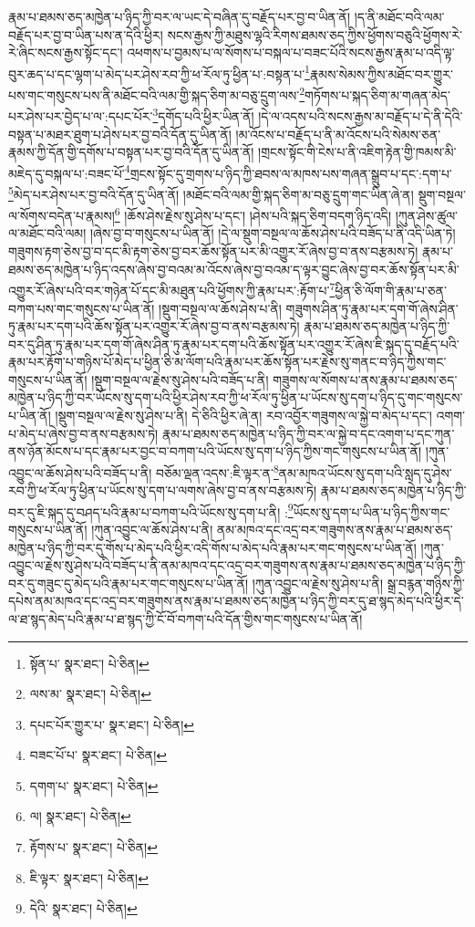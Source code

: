 རྣམ་པ་ཐམས་ཅད་མཁྱེན་པ་ཉིད་ཀྱི་བར་ལ་ཡང་དེ་བཞིན་དུ་བརྗོད་པར་བྱ་བ་ཡིན་ནོ། །ད་ནི་མཐོང་བའི་ལམ་བརྗོད་པར་བྱ་བ་ཡིན་པས་ན་དེའི་ཕྱིར། སངས་རྒྱས་ཀྱི་མཐུས་ལྷའི་རིགས་ཐམས་ཅད་ཀྱིས་ཕྱོགས་བཅུའི་ཕྱོགས་རེ་རེ་ཞིང་སངས་རྒྱས་སྟོང་དང་། འཕགས་པ་བྱམས་པ་ལ་སོགས་པ་བསྐལ་པ་བཟང་པོའི་སངས་རྒྱས་རྣམ་པ་འདི་ལྟ་བུར་ཆད་པ་དང་ལྷག་པ་མེད་པར་ཤེས་རབ་ཀྱི་ཕ་རོལ་ཏུ་ཕྱིན་པ་:བསྟན་པ་\footnote{སྟོན་པ་  སྣར་ཐང་།  པེ་ཅིན། }རྣམས་སེམས་ཀྱིས་མཐོང་བར་གྱུར་པས་གང་གསུངས་པས་ནི་མཐོང་བའི་ལམ་གྱི་སྐད་ཅིག་མ་བཅུ་དྲུག་ལས་\footnote{ལས་མ་  སྣར་ཐང་།  པེ་ཅིན། }གཏོགས་པ་སྐད་ཅིག་མ་གཞན་མེད་པར་ཤེས་པར་བྱེད་པ་ལ་:དཔང་པོར་\footnote{དཔང་པོར་གྱུར་པ་  སྣར་ཐང་།  པེ་ཅིན། }དགོད་པའི་ཕྱིར་ཡིན་ནོ། །དེ་ལ་འདས་པའི་སངས་རྒྱས་མ་བརྗོད་པ་དེ་ནི་དེའི་བསྟན་པ་མཐར་ཐུག་པ་ཤེས་པར་བྱ་བའི་དོན་དུ་ཡིན་ནོ། །མ་འོངས་པ་བརྗོད་པ་ནི་མ་འོངས་པའི་སེམས་ཅན་རྣམས་ཀྱི་དོན་གྱི་དགོས་པ་བསྟན་པར་བྱ་བའི་དོན་དུ་ཡིན་ནོ། །གྲངས་སྟོང་གི་ངེས་པ་ནི་འཇིག་རྟེན་གྱི་ཁམས་མི་མཇེད་དུ་བསྐལ་པ་:བཟང་པོ་\footnote{བཟང་པོ་པ་  སྣར་ཐང་།  པེ་ཅིན། }གྲངས་སྟོང་དུ་གྲགས་པ་ཉིད་ཀྱི་ཐབས་ལ་མཁས་པས་གཞན་སྒྲུབ་པ་དང་:དག་པ་\footnote{དགག་པ་  སྣར་ཐང་།  པེ་ཅིན། }མེད་པར་ཤེས་པར་བྱ་བའི་དོན་དུ་ཡིན་ནོ། །མཐོང་བའི་ལམ་གྱི་སྐད་ཅིག་མ་བཅུ་དྲུག་གང་ཡིན་ཞེ་ན། སྡུག་བསྔལ་ལ་སོགས་བདེན་པ་རྣམས།\footnote{ལ།  སྣར་ཐང་།  པེ་ཅིན། } །ཆོས་ཤེས་རྗེས་སུ་ཤེས་པ་དང་། །ཤེས་པའི་སྐད་ཅིག་བདག་ཉིད་འདི། །ཀུན་ཤེས་ཚུལ་ལ་མཐོང་བའི་ལམ། །ཞེས་བྱ་བ་གསུངས་པ་ཡིན་ནོ། །དེ་ལ་སྡུག་བསྔལ་ལ་ཆོས་ཤེས་པའི་བཟོད་པ་ནི་འདི་ཡིན་ཏེ། གཟུགས་རྟག་ཅེས་བྱ་བ་དང་མི་རྟག་ཅེས་བྱ་བར་ཆོས་སྟོན་པར་མི་འགྱུར་རོ་ཞེས་བྱ་བ་ནས་བརྩམས་ཏེ། རྣམ་པ་ཐམས་ཅད་མཁྱེན་པ་ཉིད་འདས་ཞེས་བྱ་བའམ་མ་འོངས་ཞེས་བྱ་བའམ་ད་ལྟར་བྱུང་ཞེས་བྱ་བར་ཆོས་སྟོན་པར་མི་འགྱུར་རོ་ཞེས་པའི་བར་གཉེན་པོ་དང་མི་མཐུན་པའི་ཕྱོགས་ཀྱི་རྣམ་པར་:རྟོག་པ་\footnote{རྟོགས་པ་  སྣར་ཐང་།  པེ་ཅིན། }ཕྱིན་ཅི་ལོག་གི་རྣམ་པ་ཅན་བཀག་པས་གང་གསུངས་པ་ཡིན་ནོ། །སྡུག་བསྔལ་ལ་ཆོས་ཤེས་པ་ནི། གཟུགས་ཤིན་ཏུ་རྣམ་པར་དག་གོ་ཞེས་ཤིན་ཏུ་རྣམ་པར་དག་པའི་ཆོས་སྟོན་པར་འགྱུར་རོ་ཞེས་བྱ་བ་ནས་བརྩམས་ཏེ། རྣམ་པ་ཐམས་ཅད་མཁྱེན་པ་ཉིད་ཀྱི་བར་དུ་ཤིན་ཏུ་རྣམ་པར་དག་གོ་ཞེས་ཤིན་ཏུ་རྣམ་པར་དག་པའི་ཆོས་སྟོན་པར་འགྱུར་རོ་ཞེས་ཇི་སྐད་དུ་བརྗོད་པའི་རྣམ་པར་རྟོག་པ་གཉིས་པོ་མེད་པ་ཕྱིན་ཅི་མ་ལོག་པའི་རྣམ་པར་ཆོས་སྟོན་པར་རྗེས་སུ་གནང་བ་ཉིད་ཀྱིས་གང་གསུངས་པ་ཡིན་ནོ། །སྡུག་བསྔལ་ལ་རྗེས་སུ་ཤེས་པའི་བཟོད་པ་ནི། གཟུགས་ལ་སོགས་པ་ནས་རྣམ་པ་ཐམས་ཅད་མཁྱེན་པ་ཉིད་ཀྱི་བར་ཡོངས་སུ་དག་པའི་ཕྱིར་ཤེས་རབ་ཀྱི་ཕ་རོལ་ཏུ་ཕྱིན་པ་ཡོངས་སུ་དག་པ་ཉིད་དུ་གང་གསུངས་པ་ཡིན་ནོ། །སྡུག་བསྔལ་ལ་རྗེས་སུ་ཤེས་པ་ནི། དེ་ཅིའི་ཕྱིར་ཞེ་ན། རབ་འབྱོར་གཟུགས་ལ་སྐྱེ་བ་མེད་པ་དང་། འགག་པ་མེད་པ་ཞེས་བྱ་བ་ནས་བརྩམས་ཏེ། རྣམ་པ་ཐམས་ཅད་མཁྱེན་པ་ཉིད་ཀྱི་བར་ལ་སྐྱེ་བ་དང་འགག་པ་དང་ཀུན་ནས་ཉོན་མོངས་པ་དང་རྣམ་པར་བྱང་བ་བཀག་པའི་ཡོངས་སུ་དག་པ་ཉིད་ཀྱིས་གང་གསུངས་པ་ཡིན་ནོ། །ཀུན་འབྱུང་ལ་ཆོས་ཤེས་པའི་བཟོད་པ་ནི། བཅོམ་ལྡན་འདས་:ཇི་ལྟར་ན་\footnote{ཇི་ལྟར་  སྣར་ཐང་།  པེ་ཅིན། }ནམ་མཁའ་ཡོངས་སུ་དག་པའི་སླད་དུ་ཤེས་རབ་ཀྱི་ཕ་རོལ་ཏུ་ཕྱིན་པ་ཡོངས་སུ་དག་པ་ལགས་ཞེས་བྱ་བ་ནས་བརྩམས་ཏེ། རྣམ་པ་ཐམས་ཅད་མཁྱེན་པ་ཉིད་ཀྱི་བར་དུ་ཇི་སྐད་དུ་བཤད་པའི་རྣམ་པ་བཀག་པའི་ཡོངས་སུ་དག་པ་ནི། :\footnote{དེའི་  སྣར་ཐང་།  པེ་ཅིན། }ཡོངས་སུ་དག་པ་ཡིན་པ་ཉིད་ཀྱིས་གང་གསུངས་པ་ཡིན་ནོ། །ཀུན་འབྱུང་ལ་ཆོས་ཤེས་པ་ནི། ནམ་མཁའ་དང་འདྲ་བར་གཟུགས་ནས་རྣམ་པ་ཐམས་ཅད་མཁྱེན་པ་ཉིད་ཀྱི་བར་དུ་གོས་པ་མེད་པའི་ཕྱིར་འདི་གོས་པ་མེད་པའི་རྣམ་པར་གང་གསུངས་པ་ཡིན་ནོ། །ཀུན་འབྱུང་ལ་རྗེས་སུ་ཤེས་པའི་བཟོད་པ་ནི་ནམ་མཁའ་དང་འདྲ་བར་གཟུགས་ནས་རྣམ་པ་ཐམས་ཅད་མཁྱེན་པ་ཉིད་ཀྱི་བར་དུ་གཟུང་དུ་མེད་པའི་རྣམ་པར་གང་གསུངས་པ་ཡིན་ནོ། །ཀུན་འབྱུང་ལ་རྗེས་སུ་ཤེས་པ་ནི། སྒྲ་བརྙན་གཉིས་ཀྱི་དཔེས་ནམ་མཁའ་དང་འདྲ་བར་གཟུགས་ནས་རྣམ་པ་ཐམས་ཅད་མཁྱེན་པ་ཉིད་ཀྱི་བར་དུ་ཐ་སྙད་མེད་པའི་ཕྱིར་དེ་ལ་ཐ་སྙད་མེད་པའི་རྣམ་པ་ཐ་སྙད་ཀྱི་ངོ་བོ་བཀག་པའི་དོན་གྱིས་གང་གསུངས་པ་ཡིན་ནོ། 